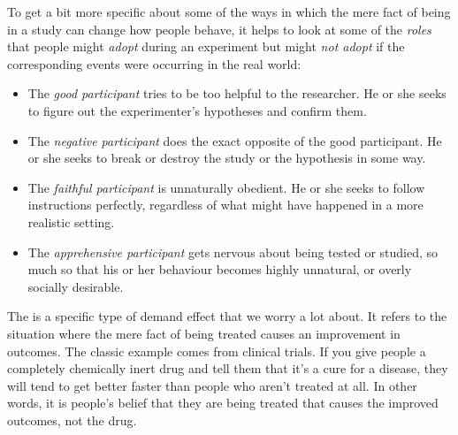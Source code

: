 

To get a bit more specific about some of the ways in which the mere fact of being in a study can change how people behave, it helps to look at some of the {\it roles} that people might {\it adopt} during an experiment but might {\it not adopt} if the corresponding events were occurring in the real world:
\begin{itemize}
\item The {\it good participant} tries to be too helpful to the researcher. He or she seeks to figure out the experimenter's hypotheses and confirm them.
\item The {\it negative participant} does the exact opposite of the good participant. He or she seeks to break or destroy the study or the hypothesis in some way.
\item The {\it faithful participant} is unnaturally obedient. He or she seeks to follow instructions perfectly, regardless of what might have happened in a more realistic setting.
\item The {\it apprehensive participant} gets nervous about being tested or studied, so much so that his or her behaviour becomes highly unnatural, or overly socially desirable.
\end{itemize}



The  is a specific type of demand effect that we worry a lot about. It refers to the situation where the mere fact of being treated causes an improvement in outcomes. The classic example comes from clinical trials. If you give people a completely chemically inert drug and tell them that it's a cure for a disease, they will tend to get better faster than people who aren't treated at all. In other words, it is people's belief that they are being treated that causes the improved outcomes, not the drug.

